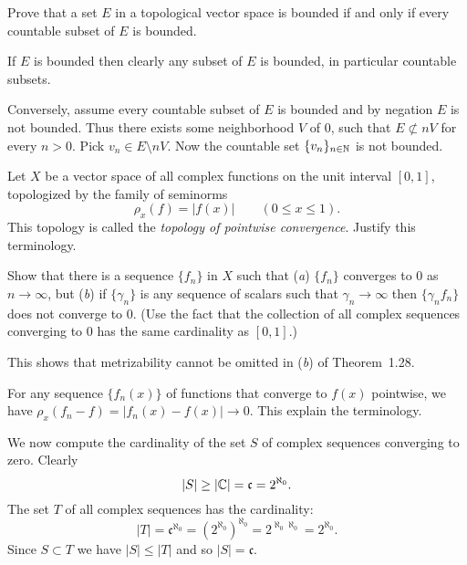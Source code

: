 \begin{enumerate}
\begin{excopy}
Prove that a set $E$ in a topological vector space is bounded if and only if
every countable subset of $E$ is bounded.
\end{excopy}

If $E$ is bounded then clearly any subset of $E$ is bounded, 
in  particular countable subsets.

Conversely, assume every countable subset of $E$ is bounded
and by negation $E$ is not bounded.
Thus there exists some neighborhood $V$ of $0$, such that 
\(E\not\subset nV\) for every \(n > 0\).
Pick \(v_n \in E \setminus nV\). 
Now the countable set \(\{v_n\}_{n\in \mathbb{N}}\) is not bounded.

\begin{excopy}
Let $X$ be a vector space of all complex functions
on the unit interval \([0,1]\), topologized by the family of seminorms
\begin{equation*}
 \rho_x(f) = |f(x)|\qquad (0\leq x \leq 1).
\end{equation*}
This topology is called the 
\emph{topology of pointwise convergence}.
Justify this terminology.

Show that there is a sequence \(\{f_n\}\) in $X$ such that
(\emph{a}) \(\{f_n\}\) converges to $0$ as \(n\rightarrow \infty\),
but (\emph{b}) if \(\{\gamma_n\}\) is any sequence of scalars such that
\(\gamma_n \rightarrow \infty\)
then \(\{\gamma_n f_n\}\) does not converge to $0$.
(Use the fact that the collection of all complex sequences converging to $0$
has the same cardinality as \([0,1]\).)

This shows that metrizability cannot be omitted in (\emph{b}) of Theorem~1.28.
\end{excopy}


For any sequence \(\{f_n(x)\}\) of functions that converge to \(f(x)\)
pointwise, we have \(\rho_x(f_n - f) = |f_n(x) - f(x) | \rightarrow 0\).
This explain the terminology.

We now compute the cardinality of the set $S$ of complex sequences converging
to zero. Clearly 
\begin{equation*}
|S| \geq |\mathbb{C}| = \mathfrak{c} = 2^{\aleph_0}.
\end{equation*}
The set $T$ of all complex sequences has the cardinality:
\begin{equation*}
|T| = \mathfrak{c}^{\aleph_0} = \left(2^{\aleph_0}\right)^{\aleph_0}
 = 2^{\aleph_0\aleph_0} = 2^{\aleph_0}.
\end{equation*}
Since \(S\subset T\) we have \(|S|\leq |T|\) and so \(|S| = \mathfrak{c}\).


\end{enumerate}
